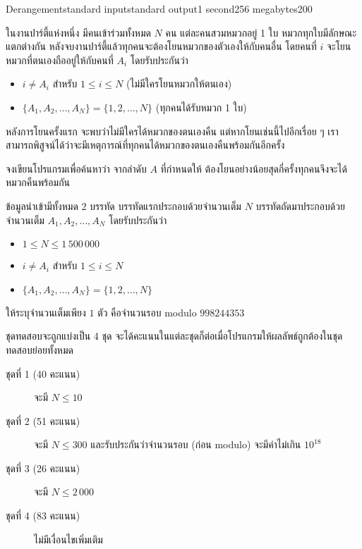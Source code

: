 \documentclass[11pt,a4paper]{article}
\begin{document}
\begin{problem}{Derangement}{standard input}{standard output}{1 second}{256 megabytes}{200}

ในงานปาร์ตี้แห่งหนึ่ง มีคนเข้าร่วมทั้งหมด $N$ คน แต่ละคนสวมหมวกอยู่ 1 ใบ หมวกทุกใบมีลักษณะแตกต่างกัน หลังจบงานปาร์ตี้แล้วทุกคนจะต้องโยนหมวกของตัวเองให้กับคนอื่น โดยคนที่ $i$ จะโยนหมวกที่ตนเองถืออยู่ให้กับคนที่ $A_i$ โดยรับประกันว่า
\begin{itemize}
\item $i \neq A_i$ สำหรับ $1 \leq i \leq N$ (ไม่มีใครโยนหมวกให้ตนเอง)
\item $\{A_1, A_2, \dots, A_N\} = \{1, 2, \dots, N\}$ (ทุกคนได้รับหมวก 1 ใบ)
\end{itemize}
หลังการโยนครั้งแรก จะพบว่าไม่มีใครได้หมวกของตนเองคืน แต่หากโยนเช่นนี้ไปอีกเรื่อย ๆ เราสามารถพิสูจน์ได้ว่าจะมีเหตุการณ์ที่ทุกคนได้หมวกของตนเองคืนพร้อมกันอีกครั้ง

จงเขียนโปรแกรมเพื่อค้นหาว่า จากลำดับ $A$ ที่กำหนดให้ ต้องโยนอย่างน้อยสุดกี่ครั้งทุกคนจึงจะได้หมวกคืนพร้อมกัน

\InputFile
ข้อมูลนำเข้ามีทั้งหมด $2$ บรรทัด บรรทัดแรกประกอบด้วยจำนวนเต็ม $N$ บรรทัดถัดมาประกอบด้วยจำนวนเต็ม $A_1, A_2, \dots, A_N$ โดยรับประกันว่า
\begin{itemize}
\item $1 \leq N \leq 1\,500\,000$
\item $i \neq A_i$ สำหรับ $1 \leq i \leq N$
\item $\{A_1, A_2, \dots, A_N\} = \{1, 2, \dots, N\}$
\end{itemize}

\OutputFile
ให้ระบุจำนวนเต็มเพียง $1$ ตัว คือจำนวนรอบ modulo $998244353$

\Scoring
ชุดทดสอบจะถูกแบ่งเป็น 4 ชุด จะได้คะแนนในแต่ละชุดก็ต่อเมื่อโปรแกรมให้ผลลัพธ์ถูกต้องในชุดทดสอบย่อยทั้งหมด

\begin{description}

\item[ชุดที่ 1 (40 คะแนน)] จะมี $N \leq 10$

\item[ชุดที่ 2 (51 คะแนน)] จะมี $N \leq 300$ และรับประกันว่าจำนวนรอบ (ก่อน modulo) จะมีค่าไม่เกิน $10^{18}$

\item[ชุดที่ 3 (26 คะแนน)] จะมี $N \leq 2\,000$

\item[ชุดที่ 4 (83 คะแนน)] ไม่มีเงื่อนไขเพิ่มเติม

\end{description}

\Examples

\begin{example}
%
\end{example}

\end{problem}
\end{document}
